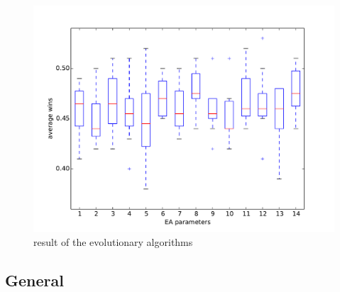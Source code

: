\begin{figure}
\centering
\includegraphics[scale=0.7]{images/eval_evolutionary.pdf}
\caption{result of the evolutionary algorithms}
\label{fig:eval_evo}
\end{figure}





\subsection{General} 
